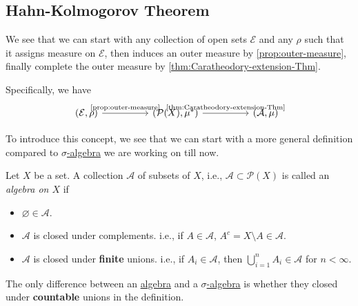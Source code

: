 \subsection{Hahn-Kolmogorov Theorem}
We see that we can start with any collection of open sets \(\mathcal{E}\) and any \(\rho\) such that it assigns measure on \(\mathcal{E}\), then induces an outer measure by \autoref{prop:outer-measure},
finally complete the outer measure by \autoref{thm:Caratheodory-extension-Thm}.

Specifically, we have
\[
	\begin{tikzcd}
		(\mathcal{E}, \rho) \ar[rr, "\text{\autoref{prop:outer-measure}}"] && (\mathcal{P}(X), \mu^{*} ) \ar[rr, "\text{\autoref{thm:Caratheodory-extension-Thm}}"] && (\mathcal{A} , \mu)
	\end{tikzcd}
\]

\par To introduce this concept, we see that we can start with a more general definition compared to \hyperref[def:sigma-algebra]{\(\sigma\)-algebra} we are working on till now.
\begin{definition}[Algebra]\label{def:algebra}
	Let \(X\) be a set. A collection \(\mathcal{A} \) of subsets of \(X\), i.e., \(\mathcal{A}\subset \mathcal{P} (X) \) is called an \emph{algebra on \(X\)} if
	\begin{itemize}
		\item \(\varnothing \in \mathcal{A} \).
		\item \(\mathcal{A} \) is closed under complements. i.e., if \(A\in \mathcal{A} \), \(A^c = X\setminus A\in \mathcal{A} \).
		\item \(\mathcal{A} \) is closed under \textbf{finite} unions. i.e., if \(A_i\in \mathcal{A} \), then \(\bigcup\limits_{i=1}^{n} A_{i}\in \mathcal{A} \) for \(n<\infty \).
	\end{itemize}
\end{definition}
\begin{remark}
	The only difference between an \hyperref[def:algebra]{algebra} and a \hyperref[def:sigma-algebra]{\(\sigma\)-algebra} is whether they closed under \textbf{countable} unions in the definition.
\end{remark}

